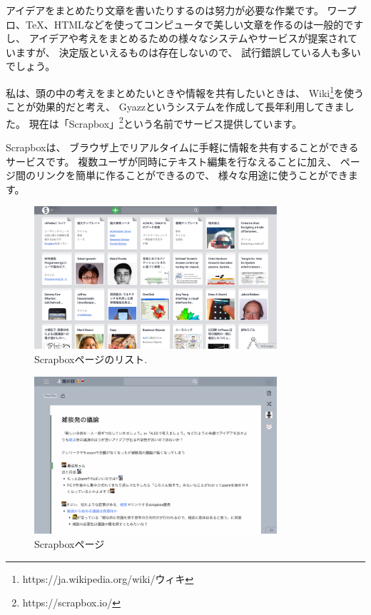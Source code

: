\documentclass[topics]{compsoft} %
\begin{document}
アイデアをまとめたり文章を書いたりするのは努力が必要な作業です。
ワープロ、{\TeX}、HTMLなどを使ってコンピュータで美しい文章を作るのは一般的ですし、
アイデアや考えをまとめるための様々なシステムやサービスが提案されていますが、
決定版といえるものは存在しないので、
試行錯誤している人も多いでしょう。

私は、頭の中の考えをまとめたいときや情報を共有したいときは、
Wiki\footnote{
  \textsf{https:{\slash}{\slash}ja.wikipedia.org{\slash}wiki{\slash}ウィキ}
}を使うことが効果的だと考え、
Gyazz\cite{Gyazz}というシステムを作成して長年利用してきました。
現在は「Scrapbox」\footnote{
  \textsf{https:{\slash}{\slash}scrapbox.io{\slash}}
}という名前でサービス提供しています。

Scrapboxは、
ブラウザ上でリアルタイムに手軽に情報を共有することができるサービスです。
複数ユーザが同時にテキスト編集を行なえることに加え、
ページ間のリンクを簡単に作ることができるので、
様々な用途に使うことができます。

\begin{figure}[t]
  \includegraphics[width=9cm,bb=0 0 2607 1535]{figures/13982c755fdc0c60af2548c0a6589543.png}
  \caption{Scrapboxページのリスト.}
  \label{example1}
\end{figure}

\begin{figure}[t]
  \includegraphics[width=9cm,bb=0 0 2235 1452]{figures/cca2e0eaed298ea4952a26d2effa238c.png}
  \caption{Scrapboxページ}
  \label{example1}
\end{figure}
\end{document}
